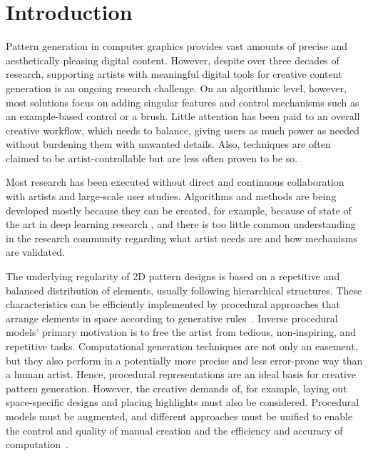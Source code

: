 \section{Introduction}
Pattern generation in computer graphics provides vast amounts of precise and aesthetically pleasing digital content. However, despite over three decades of research, supporting artists with meaningful digital tools for creative content generation is an ongoing research challenge. On an algorithmic level, however, most solutions focus on adding singular features and control mechanisms such as an example-based control or a brush. Little attention has been paid to an overall creative workflow, which needs to balance, giving users as much power as needed without burdening them with unwanted details. Also, techniques are often claimed to be artist-controllable but are less often proven to be so.

Most research has been executed without direct and continuous collaboration with artists and large-scale user studies. Algorithms and methods are being developed mostly because they can be created, for example, because of state of the art in deep learning research , and there is too little common understanding in the research community regarding what artist needs are and how mechanisms are validated.

The underlying regularity of 2D pattern designs is based on a repetitive and balanced distribution of elements, usually following hierarchical structures. These characteristics can be efficiently implemented by procedural approaches that arrange elements in space according to generative rules~\cite{stava_2010_ipm}.  Inverse procedural models' primary motivation is to free the artist from tedious, non-inspiring, and repetitive tasks. Computational generation techniques are not only an easement, but they also perform in a potentially more precise and less error-prone way than a human artist. Hence, procedural representations are an ideal basis for creative pattern generation. 
However, the creative demands of, for example, laying out space-specific designs and placing highlights must also be considered. Procedural models must be augmented, and different approaches must be unified to enable the control and quality of manual creation and the efficiency and accuracy of computation~\cite{gieseke_2017_ooo}. 

